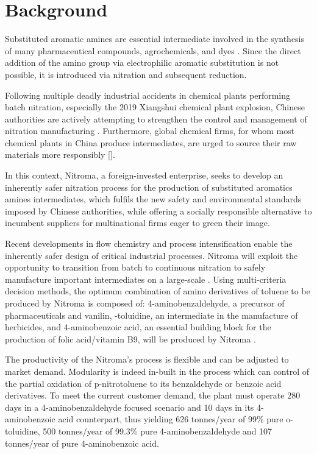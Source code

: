 \section{Background}

Substituted aromatic amines are essential intermediate involved in the synthesis of many pharmaceutical compounds, agrochemicals, and dyes \cite{vogt_amines_2000}. Since the direct addition of the amino group via electrophilic aromatic substitution is not possible, it is introduced via nitration and subsequent reduction. 

Following multiple deadly industrial accidents in chemical plants performing batch nitration, especially the 2019 Xiangshui chemical plant explosion, Chinese authorities are actively attempting to strengthen the control and management of nitration manufacturing \cite{el_diario_china_2019}. Furthermore, global chemical firms, for whom most chemical plants in China produce intermediates, are urged to source their raw materials more responsibly [].

In this context, Nitroma, a foreign-invested enterprise, seeks to develop an inherently safer nitration process for the production of substituted aromatics amines intermediates, which fulfils the new safety and environmental standards imposed by Chinese authorities, while offering a socially responsible alternative to incumbent suppliers for multinational firms eager to green their image. 

Recent developments in flow chemistry and process intensification enable the inherently safer design of critical industrial processes. Nitroma will exploit the opportunity to transition from batch to continuous nitration to safely manufacture important intermediates on a large-scale \cite{di_miceli_raimondi_safety_2015}. Using multi-criteria decision methods, the optimum combination of amino derivatives of toluene to be produced by Nitroma is composed of: 4-aminobenzaldehyde, a precursor of pharmaceuticals and vanilin, \ortho-toluidine, an intermediate in the manufacture of herbicides, and 4-aminobenzoic acid, an essential building block for the production of folic acid/vitamin B9, will be produced by Nitroma \cite{bowers_toluidines_2000,bruhne_benzaldehyde_2011,maki_benzoic_2000}.

The productivity of the Nitroma's process is flexible and can be adjusted to market demand. Modularity is indeed in-built in the process which can control of the partial oxidation of p-nitrotoluene to its benzaldehyde or benzoic acid derivatives. To meet the current customer demand, the plant must operate 280 days in a 4-aminobenzaldehyde focused scenario and 10 days in its 4-aminobenzoic acid counterpart, thus yielding 626 tonnes/year of 99\% pure o-toluidine, 500 tonnes/year of 99.3\% pure 4-aminobenzaldehyde and 107 tonnes/year of pure 4-aminobenzoic acid.


